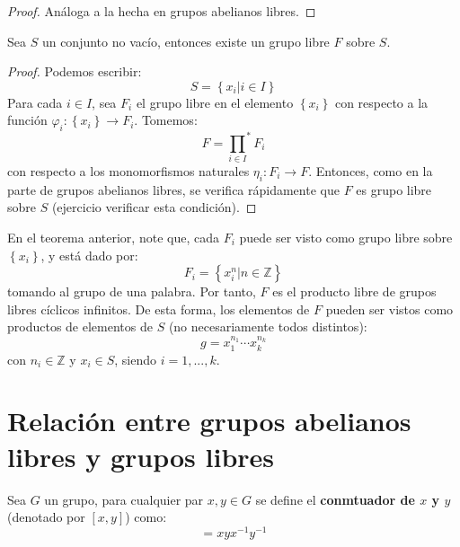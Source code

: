 \documentclass[12pt]{report}
\newcounter{it}
\theoremstyle{largebreak}
\newcommand\cf[3]{\ensuremath{#1:#2\rightarrow#3}}
\begin{document}
    \begin{proof}
        Análoga a la hecha en grupos abelianos libres.
    \end{proof}

    \begin{theor}
        Sea $S$ un conjunto no vacío, entonces existe un grupo libre $F$ sobre $S$.
    \end{theor}

    \begin{proof}
        Podemos escribir:
        \begin{equation*}
            S=\left\{x_i\Big|i\in I \right\}
        \end{equation*}
        Para cada $i\in I$, sea $F_i$ el grupo libre en el elemento $\left\{x_i \right\}$ con respecto a la función $\cf{\varphi_i}{\left\{x_i\right\}}{F_i}$. Tomemos:
        \begin{equation*}
            F={\prod_{ i\in I}}^*F_i
        \end{equation*}
        con respecto a los monomorfismos naturales $\cf{\eta_i}{F_i}{F}$. Entonces, como en la parte de grupos abelianos libres, se verifica rápidamente que $F$ es grupo libre sobre $S$ (ejercicio verificar esta condición).
    \end{proof}

    \begin{obs}
        En el teorema anterior, note que, cada $F_i$ puede ser visto como grupo libre sobre $\left\{x_i \right\}$, y está dado por:
        \begin{equation*}
            F_i=\left\{x_i^n\Big|n\in\mathbb{Z} \right\}
        \end{equation*}
        tomando al grupo de una palabra. Por tanto, $F$ es el producto libre de grupos libres cíclicos infinitos. De esta forma, los elementos de $F$ pueden ser vistos como productos de elementos de $S$ (no necesariamente todos distintos):
        \begin{equation*}
            g=x_1^{ n_1}\cdots x_k^{ n_k}
        \end{equation*}
        con $n_i\in\mathbb{Z}$ y $x_i\in S$, siendo $i=1,...,k$.
    \end{obs}

    \section{Relación entre grupos abelianos libres y grupos libres}

    \begin{mydef}
        Sea $G$ un grupo, para cualquier par $x,y\in G$ se define el \textbf{conmtuador de $x$ y $y$} (denotado por $[x,y]$) como:
        \begin{equation*}
            [x.y]=xyx^{-1}y^{-1}
        \end{equation*}
    \end{mydef}
\end{document}
